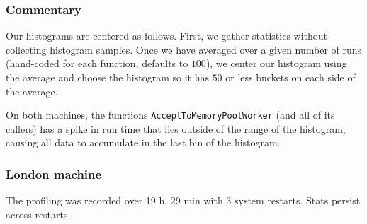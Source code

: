 \documentclass{article}
\begin{document}
\subsubsection{Commentary}
Our histograms are centered as follows. First, we gather statistics without collecting histogram samples. Once we have averaged over a given number of runs (hand-coded for each function, defaults to $100$), we center our histogram using the average and choose the histogram so it has $50$ or less buckets on each side of the average. 
 
On both machines, the functions \verb|AcceptToMemoryPoolWorker| (and all of its callers) has a spike in run time that lies outside of the range of the histogram, causing all data to accumulate in the last bin of the histogram.


\subsubsection{London machine}
The profiling was recorded over 19 h, 29 min with 3 system restarts. Stats persist across restarts.
\end{document}
